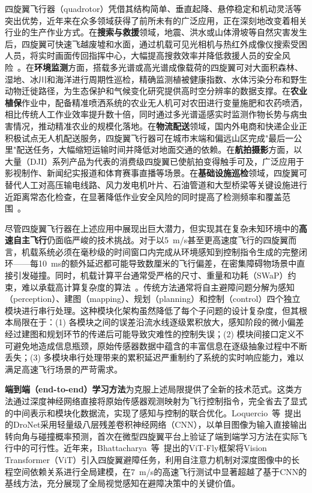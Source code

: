\documentclass[12pt,a4paper]{article}
\numberwithin{equation}{section}
\numberwithin{figure}{section}
\numberwithin{table}{section}
\begin{document}
\quad 四旋翼飞行器（quadrotor）凭借其结构简单、垂直起降、悬停稳定和机动灵活等突出优势，近年来在众多领域获得了前所未有的广泛应用，正在深刻地改变着相关行业的生产作业方式。在\textbf{搜索与救援}领域，地震、洪水或山体滑坡等自然灾害发生后，四旋翼可快速飞越废墟和水面，通过机载可见光相机与热红外成像仪搜索受困人员，将实时画面传回指挥中心，大幅提高搜救效率并降低救援人员的安全风险~\cite{kumar2012robotics}。在\textbf{环境监测}方面，搭载多光谱或高光谱成像载荷的四旋翼可对大面积森林、湿地、冰川和海洋进行周期性巡检，精确监测植被健康指数、水体污染分布和野生动物迁徙路径，为生态保护和气候变化研究提供高时空分辨率的数据支撑。在\textbf{农业植保}作业中，配备精准喷洒系统的农业无人机可对农田进行变量施肥和农药喷洒，相比传统人工作业效率提升数十倍，同时通过多光谱遥感实时监测作物长势与病虫害情况，推动精准农业的规模化落地。在\textbf{物流配送}领域，国内外电商和快递企业正积极试点无人机配送服务，四旋翼飞行器可在城市末端和偏远山区完成"最后一公里"配送任务，大幅缩短运输时间并降低对地面交通的依赖。在\textbf{航拍摄影}方面，以大量（DJI）系列产品为代表的消费级四旋翼已使航拍变得触手可及，广泛应用于影视制作、新闻纪实报道和体育赛事直播等场景。在\textbf{基础设施巡检}领域，四旋翼可替代人工对高压输电线路、风力发电机叶片、石油管道和大型桥梁等关键设施进行近距离常态化检查，在显著降低作业安全风险的同时提高了检测频率和覆盖范围~\cite{floreano2015flying}。

尽管四旋翼飞行器在上述应用中展现出巨大潜力，但实现其在复杂未知环境中的\textbf{高速自主飞行}仍面临严峻的技术挑战。对于以5~m/s甚至更高速度飞行的四旋翼而言，机载系统必须在毫秒级的时间窗口内完成从环境感知到控制指令生成的完整闭环——每10~ms的额外延迟都可能导致数厘米的飞行偏差，在密集障碍物场景中直接引发碰撞。同时，机载计算平台通常受严格的尺寸、重量和功耗（SWaP）约束，难以承载高计算复杂度的算法~。传统方法通常将自主避障问题分解为感知（perception）、建图（mapping）、规划（planning）和控制（control）四个独立模块进行串行处理。这种模块化架构虽然降低了每个子问题的设计复杂度，但其根本局限在于：(1) 各模块之间的误差沿流水线逐级累积放大，感知阶段的微小偏差经过建图和规划环节的传递后可能导致灾难性的控制失误；(2) 模块间接口定义不可避免地造成信息瓶颈，原始传感器数据中蕴含的丰富信息在逐级抽象过程中不断丢失；(3) 多模块串行处理带来的累积延迟严重制约了系统的实时响应能力，难以满足高速飞行场景的严苛需求。

\textbf{端到端（end-to-end）学习方法}为克服上述局限提供了全新的技术范式。这类方法通过深度神经网络直接将原始传感器观测映射为飞行控制指令，完全省去了显式的中间表示和模块化数据流，实现了感知与控制的联合优化。Loquercio~等~\cite{loquercio2018dronet}提出的DroNet采用轻量级八层残差卷积神经网络（CNN），以单目图像为输入直接输出转向角与碰撞概率预测，首次在微型四旋翼平台上验证了端到端学习方法在实际飞行中的可行性。近年来，Bhattacharya~等~\cite{bhattacharya2024vitfly}提出的ViT-Fly框架将Vision Transformer（ViT）引入四旋翼避障任务，利用自注意力机制对深度图像中的长程空间依赖关系进行全局建模，在7~m/s的高速飞行测试中显著超越了基于CNN的基线方法，充分展现了全局视觉感知在避障决策中的关键价值。
\end{document}

